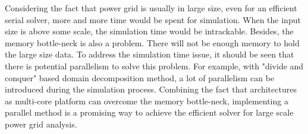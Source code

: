 \documentclass{sig-alternate}
\begin{document}
\begin{comment} 
	There are several serial simulation techniques developed to solve Equation \eqref{eq1}, including multigrid\cite{kozhaya}, 
	PCG\cite{Tsung-Hao}, random walks\cite{Boghrati}, domain-decomposition\cite{Quming,Zhongyu}, and so on. Random walks 
	is a stastical based method, and is only efficient for simulating a small subset of nodes, for eg., several thousand nodes.
	When it comes to the whole grid, it will either be time consuming to get solution, or will introduce error. The problems
	will deteriorate for larger size power grid with only a few number of VDD/GND sources. Besides, when modeling with vias, 
	this method can be trapped by vias, result in no convergence. PCG method in\cite{Tsung-Hao} is known as the fastest 
	linear solver 
	for large symmetric partial differential equations. But the total performance depends on the number of iterations. If the
	system is well-conditioned, only a few iterations are needed for convergence. In this case, due to larger effort per iteration
	for PCG than other simpler methods such as Gauss-sidel, as well as the fact that PCG consumes more memory, the total 
	performance of PCG may not be better than other simpler methods.
	
	Multigrid method achieves near linear simulation time with input size. The fine grid is recursively restricted into coarse ones 
	and the solution from coarse grids will be interpolated back into fine ones. Because of restriction and interpolation, 
	only approximate solution can be obtained. The error can be intractable for large or ill-conditioned system. Domain 
	decomposition is based on the idea of ``divide and conquer". 
	There are two kinds of domain decomposition(DD): Schur Complement DD (SCM) and Additive Schwarz DD (ASM). The main difference 
	is that Shur 
	Complement DD partitions find grid into subdomains with a common interface, while in Additive Schwarz DD, there is no 
	interface between subdomains. For SCM, 
	the dense characteristic of schur matrix limits the interface size to be small. As a result, this method can not solve too 
	large problems at low cost.
\end{comment}
	Considering the fact that power grid is usually in large size, even for an efficient serial solver, more and more time would be
	spent for simulation. When the input size is above some scale, the simulation time would be intrackable.
	Besides, the memory bottle-neck is also a problem. There will not be enough memory to hold the large size data. To address the
	simulation time issue, it should be seen that there is potential parallelism to solve this problem. For example, with "divide and
	conquer" based domain decomposition method, a lot of parallelism can be introduced during the simulation process. Combining the 
	fact that architectures as multi-core platform can overcome the memory bottle-neck, implementing a parallel method is a 
	promising way to achieve the efficient solver for large scale power grid analysis. 
\end{document}
